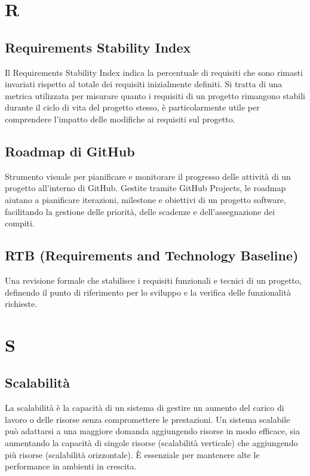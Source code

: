 \documentclass{article}
\begin{document}
\newpage

\section{R}

\subsection{Requirements Stability Index}
Il Requirements Stability Index indica la percentuale di requisiti che sono rimasti invariati rispetto al totale dei requisiti inizialmente definiti. Si tratta di una metrica utilizzata per misurare quanto i requisiti di un progetto rimangono stabili durante il ciclo di vita del progetto stesso, è particolarmente utile per comprendere l’impatto delle modifiche ai requisiti sul progetto.

\subsection{Roadmap di GitHub}
Strumento visuale per pianificare e monitorare il progresso delle attività di un progetto all'interno di GitHub. Gestite tramite GitHub Projects, le roadmap aiutano a pianificare iterazioni, milestone e obiettivi di un progetto software, facilitando la gestione delle priorità, delle scadenze e dell'assegnazione dei compiti.

\subsection{RTB (Requirements and Technology Baseline)}
Una revisione formale che stabilisce i requisiti funzionali e tecnici di un progetto, definendo il punto di riferimento per lo sviluppo e la verifica delle funzionalità richieste.

\newpage
\section{S}

\subsection{Scalabilità}
La scalabilità è la capacità di un sistema di gestire un aumento del carico di lavoro o delle risorse senza compromettere le prestazioni. Un sistema scalabile può adattarsi a una maggiore domanda aggiungendo risorse in modo efficace, sia aumentando la capacità di singole risorse (scalabilità verticale) che aggiungendo più risorse (scalabilità orizzontale). È essenziale per mantenere alte le performance in ambienti in crescita.
\end{document}
